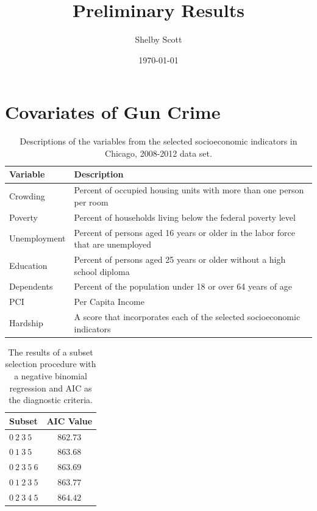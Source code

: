 \documentclass{article}
\begin{document}
\title{Preliminary Results}
\author{Shelby Scott}
\date{\today}
\maketitle

\section*{Covariates of Gun Crime}
\begin{table}[htbp] \centering
 \label{SES_Categories}
 \begin{tabular}{|l|l|} \hline
  \textbf{Variable} & \textbf{Description} \\\hline
  Crowding & Percent of occupied housing units with more than one person per room \\\hline
  Poverty & Percent of households living below the federal poverty level \\\hline
  Unemployment & Percent of persons aged 16 years or older in the labor force that are unemployed \\\hline
  Education & Percent of persons aged 25 years or older without a high school diploma \\\hline
  Dependents & Percent of the population under 18 or over 64 years of age \\\hline
  PCI & Per Capita Income \\\hline
  Hardship & A score that incorporates each of the selected socioeconomic indicators \\\hline
 \end{tabular}
 \caption{Descriptions of the variables from the selected socioeconomic indicators in Chicago, 2008-2012 data set.}
\end{table}

\begin{table}[htbp] \centering
\label{AICResults}
 \begin{tabular}{|l|c|} \hline
  \textbf{Subset} & \textbf{AIC Value} \\\hline
  $0~2~3~5$ & $862.73$ \\\hline
  $0~1~3~5$ & $863.68$ \\\hline
  $0~2~3~5~6$ & $863.69$ \\\hline
  $0~1~2~3~5$ & $863.77$ \\\hline
  $0~2~3~4~5$ & $864.42$ \\\hline
 \end{tabular}
\caption{The results of a subset selection procedure with a negative binomial regression and AIC as the diagnostic criteria.}
\end{table}
\end{document}
